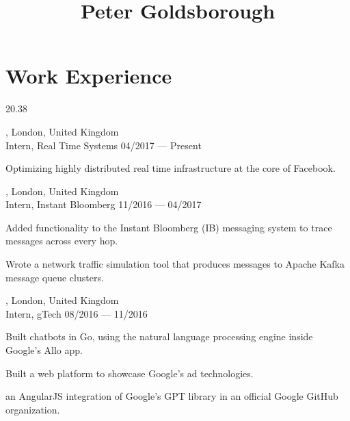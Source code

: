 




\begin{header}
	\title{Peter Goldsborough}
	\separate
	\separate
\end{header}

\section{Work Experience}{2}{0.38}

\begin{entry}
	{, London, United Kingdom}
	{\\Intern, Real Time Systems}
	{04/2017 --- Present}
	\item Optimizing highly distributed real time infrastructure at the core of Facebook.
\end{entry}

\begin{entry}
	{, London, United Kingdom}
	{\\Intern, Instant Bloomberg}
	{11/2016 --- 04/2017}
  \item Added functionality to the Instant Bloomberg (IB) messaging system to trace messages across every hop.
  \item Wrote a network traffic simulation tool that produces messages to Apache Kafka message queue clusters.
\end{entry}

\begin{entry}
  {, London, United Kingdom}
	{\\Intern, gTech}
	{08/2016 --- 11/2016}
  \item Built chatbots in Go, using the natural language processing engine inside Google's Allo app.
  \item Built a web platform to showcase Google's ad technologies.
  \item {} an AngularJS integration of Google’s GPT library in an official Google GitHub organization.
\end{entry}

